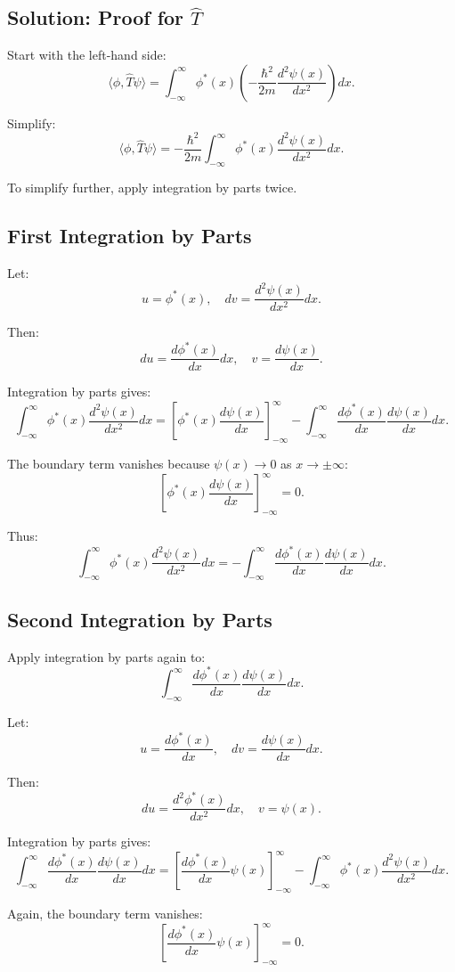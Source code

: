 \documentclass[a4paper,12pt]{article}
\begin{document}
\subsection*{Solution: Proof for $\hat{T}$}
Start with the left-hand side:
\[
\langle \phi, \hat{T} \psi \rangle = \int_{-\infty}^\infty \phi^*(x) \left(-\frac{\hbar^2}{2m} \frac{d^2\psi(x)}{dx^2}\right) dx.
\]

Simplify:
\[
\langle \phi, \hat{T} \psi \rangle = -\frac{\hbar^2}{2m} \int_{-\infty}^\infty \phi^*(x) \frac{d^2\psi(x)}{dx^2} dx.
\]

To simplify further, apply integration by parts twice.

\subsection*{First Integration by Parts}
Let:
\[
u = \phi^*(x), \quad dv = \frac{d^2\psi(x)}{dx^2} dx.
\]

Then:
\[
du = \frac{d\phi^*(x)}{dx} dx, \quad v = \frac{d\psi(x)}{dx}.
\]

Integration by parts gives:
\[
\int_{-\infty}^\infty \phi^*(x) \frac{d^2\psi(x)}{dx^2} dx = \left[\phi^*(x) \frac{d\psi(x)}{dx}\right]_{-\infty}^\infty - \int_{-\infty}^\infty \frac{d\phi^*(x)}{dx} \frac{d\psi(x)}{dx} dx.
\]

The boundary term vanishes because $\psi(x) \to 0$ as $x \to \pm \infty$:
\[
\left[\phi^*(x) \frac{d\psi(x)}{dx}\right]_{-\infty}^\infty = 0.
\]

Thus:
\[
\int_{-\infty}^\infty \phi^*(x) \frac{d^2\psi(x)}{dx^2} dx = -\int_{-\infty}^\infty \frac{d\phi^*(x)}{dx} \frac{d\psi(x)}{dx} dx.
\]

\subsection*{Second Integration by Parts}
Apply integration by parts again to:
\[
\int_{-\infty}^\infty \frac{d\phi^*(x)}{dx} \frac{d\psi(x)}{dx} dx.
\]

Let:
\[
u = \frac{d\phi^*(x)}{dx}, \quad dv = \frac{d\psi(x)}{dx} dx.
\]

Then:
\[
du = \frac{d^2\phi^*(x)}{dx^2} dx, \quad v = \psi(x).
\]

Integration by parts gives:
\[
\int_{-\infty}^\infty \frac{d\phi^*(x)}{dx} \frac{d\psi(x)}{dx} dx = \left[\frac{d\phi^*(x)}{dx} \psi(x)\right]_{-\infty}^\infty - \int_{-\infty}^\infty \phi^*(x) \frac{d^2\psi(x)}{dx^2} dx.
\]

Again, the boundary term vanishes:
\[
\left[\frac{d\phi^*(x)}{dx} \psi(x)\right]_{-\infty}^\infty = 0.
\]
\end{document}
